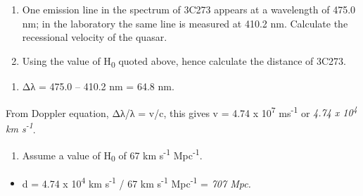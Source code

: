 \documentclass[revision-guide.tex]{subfiles}
\begin{document}
\begin{example}

\begin{enumerate}
\def\labelenumi{\arabic{enumi}.}
\item
  One emission line in the spectrum of 3C273 appears at a wavelength of
  475.0 nm; in the laboratory the same line is measured at 410.2 nm.
  Calculate the recessional velocity of the quasar.
\item
  Using the value of H\textsubscript{0} quoted above, hence calculate
  the distance of 3C273.
\end{enumerate}

\answer

\begin{enumerate}
\def\labelenumi{\arabic{enumi}.}
\item
  Δλ = 475.0 -- 410.2 nm = 64.8 nm.
\end{enumerate}

From Doppler equation, Δλ/λ = v/c, this gives v = 4.74 x
10\textsuperscript{7} ms\textsuperscript{-1} or \emph{4.74 x
10\textsuperscript{4} km s\textsuperscript{-1}}.

\begin{enumerate}
\def\labelenumi{\arabic{enumi}.}
\item
  Assume a value of H\textsubscript{0} of 67 km s\textsuperscript{-1}
  Mpc\textsuperscript{-1}.
\end{enumerate}

\begin{itemize}
\item
  d = 4.74 x 10\textsuperscript{4} km s\textsuperscript{-1} / 67 km
  s\textsuperscript{-1} Mpc\textsuperscript{-1} = \emph{707 Mpc.}
\end{itemize}


\end{example}
\end{document}
